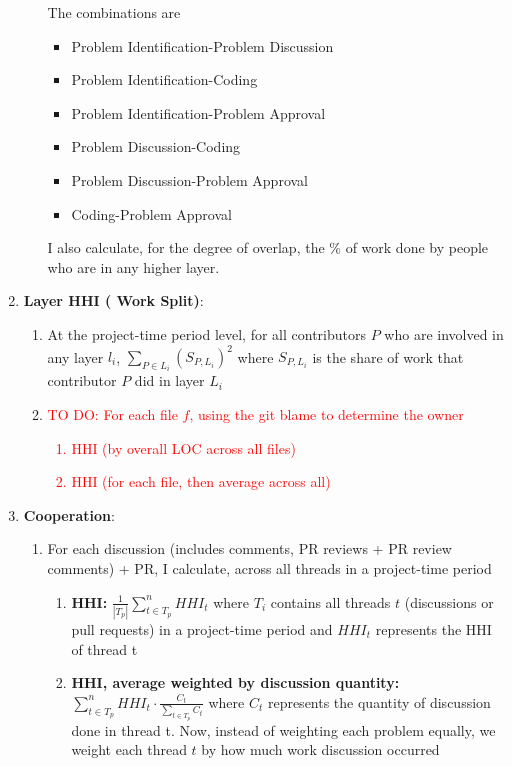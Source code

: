 \documentclass[source/paper/main.tex]{subfiles}
\begin{document}
\begin{enumerate}
\begin{enumerate}
        The combinations are 
        \begin{itemize}
            \item Problem Identification-Problem Discussion
            \item Problem Identification-Coding
            \item Problem Identification-Problem Approval   
            \item Problem Discussion-Coding
            \item Problem Discussion-Problem Approval  
            \item Coding-Problem Approval
        \end{itemize}
        I also calculate, for the degree of overlap, the \% of work done by people who are in any higher layer. 
    \end{enumerate}
    \item \textbf{Layer HHI ( Work Split)}: 
    \begin{enumerate}
        \item At the project-time period level, for all contributors $P$ who are involved in any layer $l_i$, $\sum_{P \in L_i} \left(S_{P, L_i} \right)^2$ where $S_{P,L_i}$ is the share of work that contributor $P$ did in layer $L_i$
        \item \textcolor{red}{TO DO: For each file $f$, using the git blame to determine the owner
        \begin{enumerate}
            \item HHI (by overall LOC across all files)
            \item HHI (for each file, then average across all)
        \end{enumerate}}
    \end{enumerate}
    \item \textbf{Cooperation}:
    \begin{enumerate}
        \item For each discussion (includes comments, PR reviews + PR review comments) + PR, I calculate, across all threads in a project-time period
        \begin{enumerate}
            \item \textbf{HHI:} $\frac{1}{|T_p|} \sum_{t \in T_p}^n HHI_{t} $ where $T_i$ contains all threads $t$ (discussions or pull requests) in a project-time period and $HHI_{t}$ represents the HHI of thread t
            \item \textbf{HHI, average weighted by discussion quantity:} $\sum_{t \in T_p}^n HHI_{t} \cdot \frac{C_{t}}{\sum_{t \in T_p} C_{t}}$ where $C_{t}$ represents the quantity of discussion done in thread t. Now, instead of weighting each problem equally, we weight each thread $t$ by how much work discussion occurred 

\end{enumerate}
\end{enumerate}
\end{enumerate}
\end{document}
